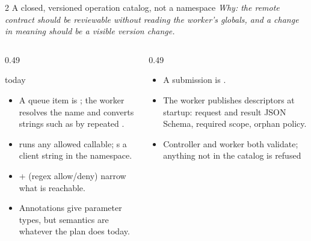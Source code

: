 \begin{frame}{2 \quad A closed, versioned operation catalog, not a namespace}
    {\footnotesize\itshape Why: the remote contract should be reviewable without reading the worker's globals,
    and a change in meaning should be a visible version change.}
    \vspace{0.05cm}
    \begin{columns}[T]
        \begin{column}{0.49\textwidth}
            \begin{alertblock}{\legacy{} today}
                \footnotesize
                \begin{itemize}
                    \item A queue item is ; the worker resolves
                          the name and converts strings such as  by repeated .
                    \item {} runs any allowed callable;
                           s a client string in the namespace.
                    \item {} + 
                          (regex allow/deny) narrow what is reachable. 
                    \item Annotations give parameter types, but semantics are whatever the plan does today.
                \end{itemize}
            \end{alertblock}
        \end{column}
        \begin{column}{0.49\textwidth}
            \begin{block}{\vtwo{}}
                \footnotesize
                \begin{itemize}
                    \item A submission is .
                    \item The worker publishes descriptors at startup: request and result JSON Schema,
                          required scope, orphan policy. 
                    \item Controller and worker both validate; anything not in the catalog is refused

\end{itemize}
\end{block}
\end{column}
\end{columns}
\end{frame}
